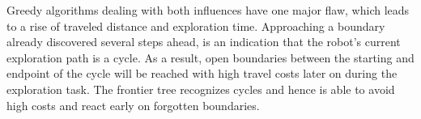 \documentclass[twocolumn]{svjour3}[2016]
\begin{document}
Greedy algorithms dealing with both influences have one major flaw, which leads to a rise of traveled distance and exploration time. Approaching a boundary already discovered several steps ahead, is an indication that the robot's current exploration path is a cycle. As a result, open boundaries between the starting and endpoint of the cycle will be reached with high travel costs later on during the exploration task. The frontier tree recognizes cycles and hence is able to avoid high costs and react early on forgotten boundaries.

\end{document}
